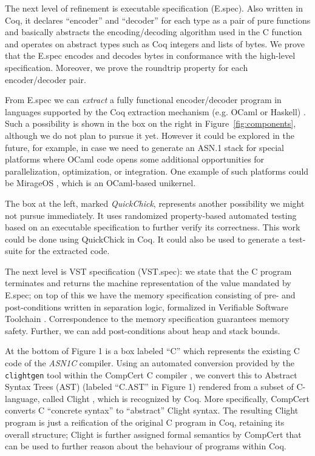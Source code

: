 \documentclass[10p,conference]{IEEEtran}
\begin{document}
The next level of refinement is executable specification (E.spec). Also
written in Coq, it declares ``encoder'' and ``decoder'' for each type
as a pair of pure functions and basically abstracts the encoding/decoding algorithm used in the C function and operates on abstract types such as Coq integers and lists of bytes. We prove that the E.spec encodes and decodes bytes in conformance with the high-level
specification. Moreover, we prove the roundtrip property for each encoder/decoder pair.

From E.spec we can \textit{extract} a fully functional encoder/decoder program in
languages supported by the Coq extraction mechanism (e.g. OCaml or
Haskell) \cite{Extraction}. Such a possibility is shown in the box
on the right in Figure~\ref{fig:components}, although we do not plan to
pursue it yet. However it could be explored in the future, for example,
in case we need to generate an ASN.1 stack for special platforms where
OCaml code opens some additional opportunities for parallelization,
optimization, or integration. One example of such platforms could be
MirageOS \cite{MirageOS}, which is an OCaml-based unikernel.

The box at the left, marked \textit{QuickChick}, represents another
possibility we might not pursue immediately. It uses randomized
property-based automated testing based on an executable
specification to further verify its correctness. This work could be
done using QuickChick \cite{QuickChick} in Coq. It could also be used
to generate a test-suite for the extracted code.

The next level is VST specification (VST.spec): we state that the C
program terminates and returns the machine representation of the value
mandated by E.spec; on top of this we have the memory specification
consisting of pre- and post-conditions written in separation logic,
formalized in Verifiable Software Toolchain \cite{VST}. Correspondence
to the memory specification guarantees memory safety. Further, we can
add post-conditions about heap and stack bounds.

At the bottom of Figure 1 is a box labeled ``C'' which represents the
existing C code of the \emph{ASN1C} compiler. Using an automated conversion
provided by the \texttt{clightgen} tool within the CompCert C compiler
\cite{CompCert}, we convert this to Abstract Syntax Trees (AST)
\cite{AST} (labeled ``C.AST'' in Figure 1) rendered from a subset
of C-language, called Clight \cite{Mechanized}, which is recognized by Coq. More specifically,
CompCert converts C ``concrete syntax'' to ``abstract'' Clight
syntax. The resulting Clight program is just a reification of the
original C program in Coq, retaining its overall structure; Clight is further assigned formal semantics
by CompCert that can be used to further reason about the behaviour of programs within Coq. 
\end{document}
